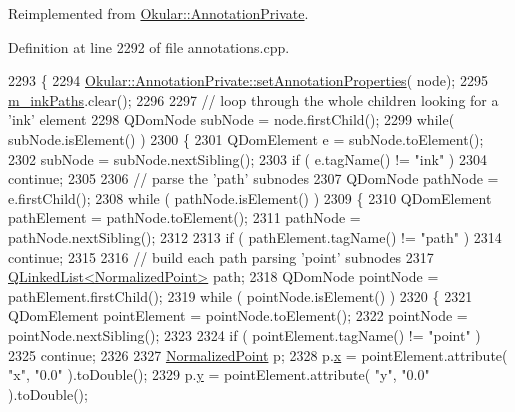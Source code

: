 Reimplemented from \hyperlink{classOkular_1_1AnnotationPrivate_a5fc7b450fa8c7e2717372e7394c3aa39}{Okular\+::\+Annotation\+Private}.



Definition at line 2292 of file annotations.\+cpp.


\begin{DoxyCode}
2293 \{
2294     \hyperlink{classOkular_1_1AnnotationPrivate_a5fc7b450fa8c7e2717372e7394c3aa39}{Okular::AnnotationPrivate::setAnnotationProperties}(
      node);
2295     \hyperlink{classOkular_1_1InkAnnotationPrivate_a4fcd86538f8aeca3558d430b9d9473b5}{m\_inkPaths}.clear();
2296 
2297     \textcolor{comment}{// loop through the whole children looking for a 'ink' element}
2298     QDomNode subNode = node.firstChild();
2299     \textcolor{keywordflow}{while}( subNode.isElement() )
2300     \{
2301         QDomElement e = subNode.toElement();
2302         subNode = subNode.nextSibling();
2303         \textcolor{keywordflow}{if} ( e.tagName() != \textcolor{stringliteral}{"ink"} )
2304             \textcolor{keywordflow}{continue};
2305 
2306         \textcolor{comment}{// parse the 'path' subnodes}
2307         QDomNode pathNode = e.firstChild();
2308         \textcolor{keywordflow}{while} ( pathNode.isElement() )
2309         \{
2310             QDomElement pathElement = pathNode.toElement();
2311             pathNode = pathNode.nextSibling();
2312 
2313             \textcolor{keywordflow}{if} ( pathElement.tagName() != \textcolor{stringliteral}{"path"} )
2314                 \textcolor{keywordflow}{continue};
2315 
2316             \textcolor{comment}{// build each path parsing 'point' subnodes}
2317             \hyperlink{classQLinkedList}{QLinkedList<NormalizedPoint>} path;
2318             QDomNode pointNode = pathElement.firstChild();
2319             \textcolor{keywordflow}{while} ( pointNode.isElement() )
2320             \{
2321                 QDomElement pointElement = pointNode.toElement();
2322                 pointNode = pointNode.nextSibling();
2323 
2324                 \textcolor{keywordflow}{if} ( pointElement.tagName() != \textcolor{stringliteral}{"point"} )
2325                     \textcolor{keywordflow}{continue};
2326 
2327                 \hyperlink{classOkular_1_1NormalizedPoint}{NormalizedPoint} p;
2328                 p.\hyperlink{classOkular_1_1NormalizedPoint_a857f49b9bc7712430d167472ef9dbd94}{x} = pointElement.attribute( \textcolor{stringliteral}{"x"}, \textcolor{stringliteral}{"0.0"} ).toDouble();
2329                 p.\hyperlink{classOkular_1_1NormalizedPoint_ac2276daabda627d5f82bb1532c293047}{y} = pointElement.attribute( \textcolor{stringliteral}{"y"}, \textcolor{stringliteral}{"0.0"} ).toDouble();

\end{DoxyCode}
